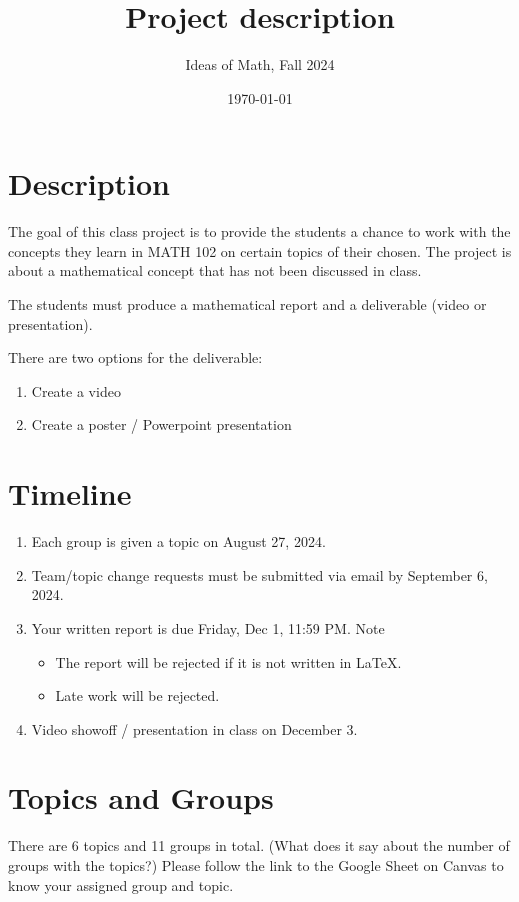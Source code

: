 \documentclass[12pt]{amsart}
\title{ Project description }
\author{Ideas of Math, Fall 2024}
\date{\today}
\begin{document}
\maketitle


\section{Description}
The goal of this class project is to provide the students a chance to work with
the concepts they learn in MATH 102 on certain topics of their chosen.
The project is about a mathematical concept that has not been discussed in class.

The students must produce a mathematical report and a deliverable (video or presentation).

There are two options for the deliverable:
\begin{enumerate}
	\item Create a video
	\item Create a poster / Powerpoint presentation
\end{enumerate}

\section{Timeline}
\begin{enumerate}
	\item Each group is given a topic on August 27, 2024.
	\item Team/topic change requests must be submitted via email by September 6, 2024.
	\item Your written report is due Friday, Dec 1, 11:59 PM. Note
	      \begin{itemize}
		      \item The report will be rejected if it is not written in LaTeX.
		      \item Late work will be rejected.
	      \end{itemize}
	\item Video showoff / presentation in class on December 3.
\end{enumerate}

\section{Topics and Groups}
There are 6 topics and 11 groups in total. (What does it say about the number of groups with the topics?)
Please follow the link to the Google Sheet on Canvas to know your assigned group and topic.
\end{document}
